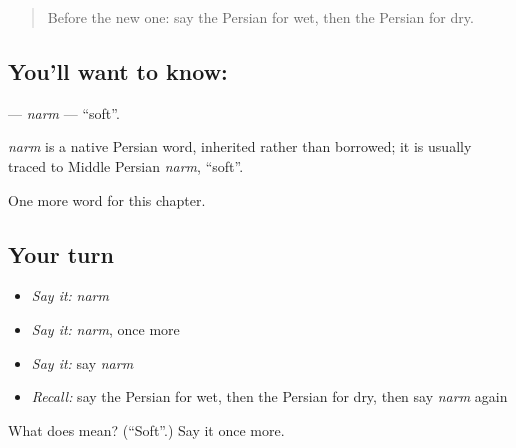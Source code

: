 \begin{quote}
Before the new one: say the Persian for wet, then the Persian for dry.
\end{quote}

\subsection*{You'll want to know: }
\textbf{} — \emph{narm} — \textquotedblleft{}soft\textquotedblright{}.

\begin{cousinweb}
\emph{narm} is a native Persian word, inherited rather than borrowed; it is usually traced to Middle Persian \emph{narm}, \textquotedblleft{}soft\textquotedblright{}.
\end{cousinweb}

\begin{grammarlens}[title={What you've built}]
One more word for this chapter.
\end{grammarlens}

\subsection*{Your turn}
\begin{itemize}
\raggedright
  \item \emph{Say it:} \emph{narm}
  \item \emph{Say it:} \emph{narm}, once more
  \item \emph{Say it:} say \emph{narm}
  \item \emph{Recall:} say the Persian for wet, then the Persian for dry, then say \emph{narm} again
\end{itemize}

\begin{tcolorbox}[breakable,colback=teal!4,colframe=teal!35!black,title={Before you move on}]
What does  mean? (\textquotedblleft{}Soft\textquotedblright{}.) Say it once more.
\end{tcolorbox}

